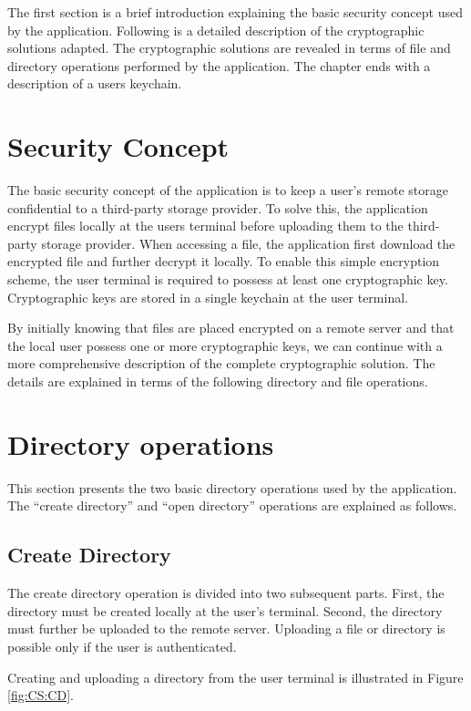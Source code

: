 \documentclass[pdftex,english,10pt,b5paper,twoside]{book}
\begin{document}
The first section is a brief introduction explaining the basic
security concept used by the application. Following is a detailed description of
the cryptographic solutions adapted. The cryptographic solutions are revealed
in terms of file and directory operations performed by the application. The
chapter ends with a description of a users keychain.

\section{Security Concept}

The basic security concept of the application is to keep a user's remote storage
confidential to a third-party storage provider. To solve this, the application
encrypt files locally at the users terminal before uploading them to the
third-party storage provider. When accessing a file, the application first
download the encrypted file and further decrypt it locally. To enable this
simple encryption scheme, the user terminal is required to possess at least one
cryptographic key. Cryptographic keys are stored in a single keychain at the user
terminal.

By initially knowing that files are placed encrypted on a remote server and that
the local user possess one or more cryptographic keys, we can continue with a
more comprehensive description of the complete cryptographic solution. The
details are explained in terms of the following directory and file operations.

\section{Directory operations}
\label{sec:CS:DO}

This section presents the two basic directory operations used by the
application. The ``create directory'' and ``open directory'' operations are
explained as follows.

\subsection{Create Directory}

The create directory operation is divided into two subsequent parts. First, the
directory must be created locally at the user's terminal. Second, the directory
must further be uploaded to the remote server.  Uploading a file or directory is
possible only if the user is authenticated.

Creating and uploading a directory from the user terminal is illustrated in
Figure \ref{fig:CS:CD}.
\end{document}
